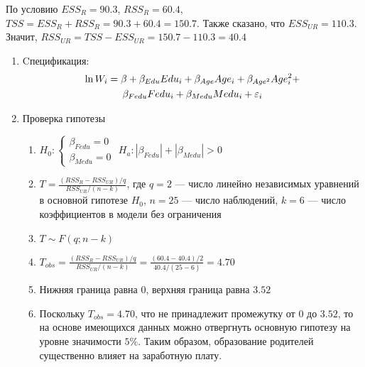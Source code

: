 \begin{problem}
\begin{sol}
По условию $ESS_R = 90.3$, $RSS_R = 60.4$, $TSS = ESS_R + RSS_R = 90.3 + 60.4 = 150.7.$ Также сказано, что $ESS_{UR} = 110.3$. Значит, $RSS_{UR} = TSS - ESS_{UR} = 150.7 - 110.3 = 40.4$
\begin{enumerate}
\item Cпецификация:
\begin{multline*}
\ln W_i = \beta + \beta_{Edu}Edu_i + \beta_{Age}Age_i + \beta_{Age^2}Age^2_i + \\
\beta_{Fedu}Fedu_i + \beta_{Medu}Medu_i + \varepsilon_i
\end{multline*}
\item Проверка гипотезы
\begin{enumerate}
\item $H_0: \begin{cases}
\beta_{Fedu} = 0  \\
\beta_{Medu} = 0
\end{cases}$
$H_a: |\beta_{Fedu}| + |\beta_{Medu}| > 0$
\item $T = \frac{(RSS_{R} - RSS_{UR})/q}{RSS_{UR}/(n - k)}$, где $q = 2$ — число линейно независимых уравнений в основной гипотезе $H_0$, $n = 25$ — число наблюдений, $k = 6$ — число коэффициентов в модели без ограничения
\item $T \sim F(q; n - k)$
\item $T_{obs} = \frac{(RSS_{R} - RSS_{UR})/q}{RSS_{UR}/(n - k)} = \frac{(60.4 - 40.4)/2}{40.4/(25 - 6)} = 4.70$
\item Нижняя граница равна $0$, верхняя граница равна $3.52$
\item Поскольку $T_{obs} = 4.70$, что не принадлежит промежутку от $0$ до $3.52$, то на основе имеющихся данных можно отвергнуть основную гипотезу на уровне значимости $5\%$. Таким образом, образование родителей существенно влияет на заработную плату.
\end{enumerate}
\end{enumerate}

\end{sol}
\end{problem}





